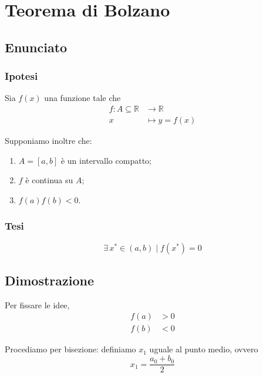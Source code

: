 \documentclass[../../dimostrazioni]{subfiles}
\begin{document}
    \chapter{Teorema di Bolzano}
    \label{teoBolzano}

        \section*{Enunciato}

            \subsection*{Ipotesi}

                Sia \(f(x)\) una funzione tale che
                \begin{align*}
                    f : A \subseteq \mathbb{R} &\longrightarrow \mathbb{R}\\
                    x &\longmapsto y = f(x) 
                \end{align*}

                Supponiamo inoltre che:

                \begin{enumerate}
                    \indentitem \item \(A = [a, b]\) è un intervallo compatto;
                    \indentitem \item \(f\) è continua su \(A\);
                    \indentitem \item \(f(a) f(b) < 0\).
                \end{enumerate}

            \subsection*{Tesi}
            
                \[\exists \, x^* \in (a,b) \; | \; f(x^*) = 0 \]

        \section*{Dimostrazione}

            Per fissare le idee,
            \begin{align*}
                f(a) &> 0\\
                f(b) &< 0
            \end{align*}

            Procediamo per bisezione: definiamo \(x_1\) uguale al punto medio, ovvero
            \[
                x_1 = \frac{a_0 + b_0}{2}
            \]
\end{document}
